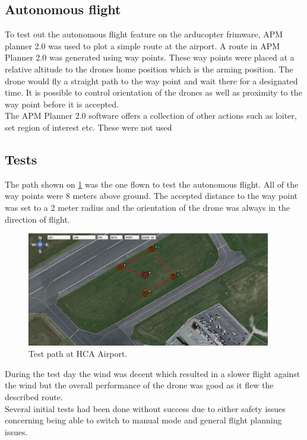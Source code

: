 \subsection{Autonomous flight}
To test out the autonomous flight feature on the arducopter frimware, APM planner 2.0 was used to plot a simple route at the airport. A route in APM Planner 2.0 was generated using way points. These way points were placed at a relative altitude to the drones home position which is the arming position. The drone would fly a straight path to the way point and wait there for a designated time. It is possible to control orientation of the drones as well as proximity to the way point before it is accepted.\\
The APM Planner 2.0 software offers a collection of other actions such as loiter, set region of interest etc. These were not used\\

 
\subsection{Tests}
The path shown on \ref{fig:HCAPath} was the one flown to test the autonomous flight. All of the way points were 8 meters above ground. The accepted distance to the way point was set to a 2 meter radius and the orientation of the drone was always in the direction of flight. 
\begin{figure}[H]
  \centering
    \includegraphics[width=0.95\textwidth]{./Images/HCAPath}
  \caption{Test path at HCA Airport.}
  \label{fig:HCAPath}
\end{figure}

During the test day the wind was decent which resulted in a slower flight against the wind but the overall performance of the drone was good as it flew the described route. \\

Several initial tests had been done without success due to either safety issues concerning being able to switch to manual mode and general flight planning issues.\\

